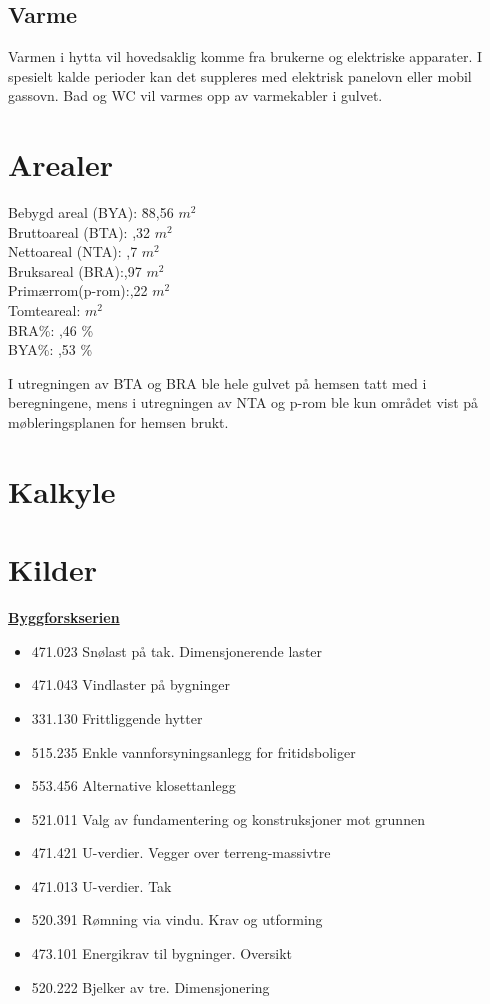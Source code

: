 \documentclass[12pt]{article}
\begin{document}
\subsection{Varme}
Varmen i hytta vil hovedsaklig komme fra brukerne og elektriske apparater. I spesielt kalde perioder kan det suppleres med elektrisk panelovn eller mobil gassovn. Bad og WC vil varmes opp av varmekabler i gulvet.


\pagebreak
\section{Arealer}

	\begin{tabbing}

Bebygd areal (BYA): \hspace{20em}\=88,56 $m^2$ \\
Bruttoareal (BTA): ,32 $m^2$\\
Nettoareal (NTA): ,7 $m^2$\\
Bruksareal (BRA):,97 $m^2$\\
Primærrom(p-rom):,22 $m^2$\\
Tomteareal: $m^2$\\
BRA\%: ,46 \% \\
BYA\%: ,53 \% \\
	\end{tabbing}

I utregningen av BTA og BRA ble hele gulvet på hemsen tatt med i beregningene, mens i utregningen av NTA og p-rom ble kun området vist på møbleringsplanen for hemsen brukt.



\pagebreak
\section{Kalkyle}



\pagebreak
\section{Kilder}
\href{http://www.byggforsk.no}{\textbf{Byggforskserien}}
\begin{itemize}
	\item 471.023 Snølast på tak. Dimensjonerende laster
	\item 471.043 Vindlaster på bygninger
	\item 331.130 Frittliggende hytter
	\item 515.235 Enkle vannforsyningsanlegg for fritidsboliger
	\item 553.456 Alternative klosettanlegg
	\item 521.011 Valg av fundamentering og konstruksjoner mot grunnen
	\item 471.421 U-verdier. Vegger over terreng-massivtre
	\item 471.013 U-verdier. Tak
	\item520.391 Rømning via vindu. Krav og utforming
	\item 473.101 Energikrav til bygninger. Oversikt
	\item 520.222 Bjelker av tre. Dimensjonering

\end{itemize}
\end{document}
